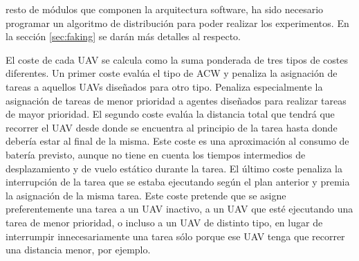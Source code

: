 \documentclass[fontsize=11pt, English=false, Español=true, Myfinal=true, twoside, numbers=noenddot]{scrbook}
\begin{document}
resto de módulos que componen la arquitectura software, ha sido necesario programar un algoritmo de distribución para poder realizar los experimentos. En la sección \ref{sec:faking} se darán más detalles al respecto.

El coste de cada \gls{UAV} se calcula como la suma ponderada de tres tipos de costes diferentes. Un primer coste evalúa el tipo de \gls{ACW} y penaliza la asignación de tareas a aquellos \glspl{UAV} diseñados para otro tipo. Penaliza especialmente la asignación de tareas de menor prioridad a agentes diseñados para realizar tareas de mayor prioridad. El segundo coste evalúa la distancia total que tendrá que recorrer el \gls{UAV} desde donde se encuentra al principio de la tarea hasta donde debería estar al final de la misma. Este coste es una aproximación al consumo de batería previsto, aunque no tiene en cuenta los tiempos intermedios de desplazamiento y de vuelo estático durante la tarea. El último coste penaliza la interrupción de la tarea que se estaba ejecutando según el plan anterior y premia la asignación de la misma tarea. Este coste pretende que se asigne preferentemente una tarea a un \gls{UAV} inactivo, a un \gls{UAV} que esté ejecutando una tarea de menor prioridad, o incluso a un \gls{UAV} de distinto tipo, en lugar de interrumpir innecesariamente una tarea sólo porque ese \gls{UAV} tenga que recorrer una distancia menor, por ejemplo.
\end{document}
